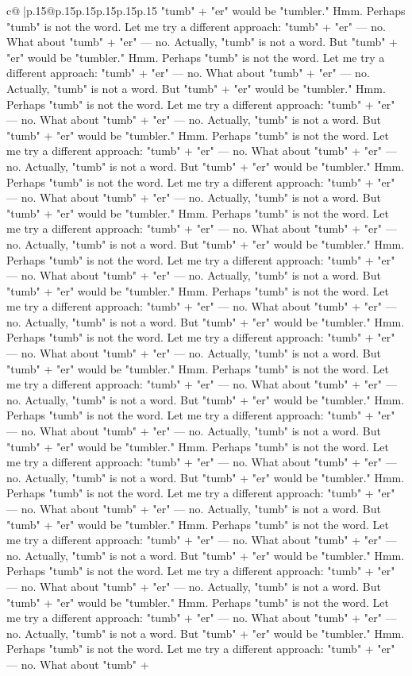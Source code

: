 \documentclass{article}
\begin{document}
{\begin{supertabular}{c@{$\;$}|p{.15\linewidth}@{}p{.15\linewidth}p{.15\linewidth}p{.15\linewidth}p{.15\linewidth}p{.15\linewidth}}
{{{"tumb" + "er" would be "tumbler." Hmm. Perhaps "tumb" is not the word. Let me try a different approach: "tumb" + "er" — no. What about "tumb" + "er" — no. Actually, "tumb" is not a word. But "tumb" + "er" would be "tumbler." Hmm. Perhaps "tumb" is not the word. Let me try a different approach: "tumb" + "er" — no. What about "tumb" + "er" — no. Actually, "tumb" is not a word. But "tumb" + "er" would be "tumbler." Hmm. Perhaps "tumb" is not the word. Let me try a different approach: "tumb" + "er" — no. What about "tumb" + "er" — no. Actually, "tumb" is not a word. But "tumb" + "er" would be "tumbler." Hmm. Perhaps "tumb" is not the word. Let me try a different approach: "tumb" + "er" — no. What about "tumb" + "er" — no. Actually, "tumb" is not a word. But "tumb" + "er" would be "tumbler." Hmm. Perhaps "tumb" is not the word. Let me try a different approach: "tumb" + "er" — no. What about "tumb" + "er" — no. Actually, "tumb" is not a word. But "tumb" + "er" would be "tumbler." Hmm. Perhaps "tumb" is not the word. Let me try a different approach: "tumb" + "er" — no. What about "tumb" + "er" — no. Actually, "tumb" is not a word. But "tumb" + "er" would be "tumbler." Hmm. Perhaps "tumb" is not the word. Let me try a different approach: "tumb" + "er" — no. What about "tumb" + "er" — no. Actually, "tumb" is not a word. But "tumb" + "er" would be "tumbler." Hmm. Perhaps "tumb" is not the word. Let me try a different approach: "tumb" + "er" — no. What about "tumb" + "er" — no. Actually, "tumb" is not a word. But "tumb" + "er" would be "tumbler." Hmm. Perhaps "tumb" is not the word. Let me try a different approach: "tumb" + "er" — no. What about "tumb" + "er" — no. Actually, "tumb" is not a word. But "tumb" + "er" would be "tumbler." Hmm. Perhaps "tumb" is not the word. Let me try a different approach: "tumb" + "er" — no. What about "tumb" + "er" — no. Actually, "tumb" is not a word. But "tumb" + "er" would be "tumbler." Hmm. Perhaps "tumb" is not the word. Let me try a different approach: "tumb" + "er" — no. What about "tumb" + "er" — no. Actually, "tumb" is not a word. But "tumb" + "er" would be "tumbler." Hmm. Perhaps "tumb" is not the word. Let me try a different approach: "tumb" + "er" — no. What about "tumb" + "er" — no. Actually, "tumb" is not a word. But "tumb" + "er" would be "tumbler." Hmm. Perhaps "tumb" is not the word. Let me try a different approach: "tumb" + "er" — no. What about "tumb" + "er" — no. Actually, "tumb" is not a word. But "tumb" + "er" would be "tumbler." Hmm. Perhaps "tumb" is not the word. Let me try a different approach: "tumb" + "er" — no. What about "tumb" + "er" — no. Actually, "tumb" is not a word. But "tumb" + "er" would be "tumbler." Hmm. Perhaps "tumb" is not the word. Let me try a different approach: "tumb" + "er" — no. What about "tumb" + "er" — no. Actually, "tumb" is not a word. But "tumb" + "er" would be "tumbler." Hmm. Perhaps "tumb" is not the word. Let me try a different approach: "tumb" + "er" — no. What about "tumb" + "er" — no. Actually, "tumb" is not a word. But "tumb" + "er" would be "tumbler." Hmm. Perhaps "tumb" is not the word. Let me try a different approach: "tumb" + "er" — no. What about "tumb" + }}}
\end{supertabular}}
\end{document}
